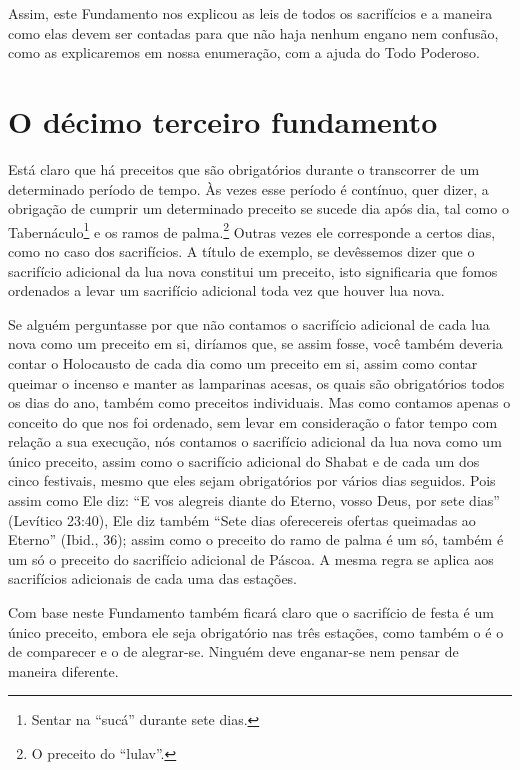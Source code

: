 Assim, este Fundamento nos explicou as leis de todos os sacrifícios e a
maneira como elas devem ser contadas para que não haja nenhum engano nem
confusão, como as explicaremos em nossa enumeração, com a ajuda do Todo
Poderoso.

\chapter*{O décimo terceiro fundamento}

Está claro que há preceitos que são obrigatórios durante o transcorrer
de um determinado período de tempo. Às vezes esse período é contínuo,
quer dizer, a obrigação de cumprir um determinado preceito se sucede dia
após dia, tal como o Tabernáculo\footnote{Sentar na ``sucá'' durante sete dias.} e os ramos de
palma.\footnote{O preceito do ``lulav''.} Outras vezes ele corresponde a certos dias,
como no caso dos sacrifícios. A título de exemplo, se devêssemos dizer
que o sacrifício adicional da lua nova constitui um preceito, isto
significaria que fomos ordenados a levar um sacrifício adicional toda
vez que houver lua nova.

Se alguém perguntasse por que não contamos o sacrifício adicional de
cada lua nova como um preceito em si, diríamos que, se assim fosse, você
também deveria contar o Holocausto de cada dia como um preceito em si,
assim como contar queimar o incenso e manter as lamparinas acesas, os
quais são obrigatórios todos os dias do ano, também como preceitos
individuais. Mas como contamos apenas o conceito do que nos foi
ordenado, sem levar em consideração o fator tempo com relação a sua
execução, nós contamos o sacrifício adicional da lua nova como um único
preceito, assim como o sacrifício adicional do Shabat e de cada um dos
cinco festivais, mesmo que eles sejam obrigatórios por vários dias
seguidos. Pois assim como Ele diz: ``E vos alegreis diante do Eterno,
vosso Deus, por sete dias'' (Levítico 23:40), Ele diz também ``Sete dias
oferecereis ofertas queimadas ao Eterno'' (Ibid., 36); assim como o
preceito do ramo de palma é um só, também é um só o preceito do
sacrifício adicional de Páscoa. A mesma regra se aplica aos sacrifícios
adicionais de cada uma das estações.

Com base neste Fundamento também ficará claro que o sacrifício de festa
é um único preceito, embora ele seja obrigatório nas três estações,
como também o é o de comparecer e o de alegrar-se. Ninguém deve
enganar-se nem pensar de maneira diferente.

